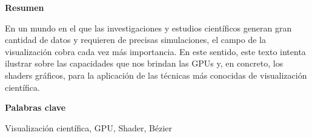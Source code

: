 
\newpage

\thispagestyle{empty}

\begin{center}

{\bf \Huge Resumen}

  \end{center} \vspace{1cm}

	En un mundo en el que las investigaciones y estudios científicos generan
	gran cantidad de datos y requieren de precisas simulaciones, el campo de la
	visualización cobra cada vez más importancia. En este sentido, este texto
	intenta ilustrar sobre las capacidades que nos brindan las GPUs y, en concreto,
	los shaders gráficos, para la aplicación de las técnicas más conocidas de
	visualización científica.

\vspace{1cm}


\begin{center}

{\bf \Large Palabras clave}

   \end{center}

   \vspace{0.5cm}
   
   Visualización científica, GPU, Shader, Bézier
   


